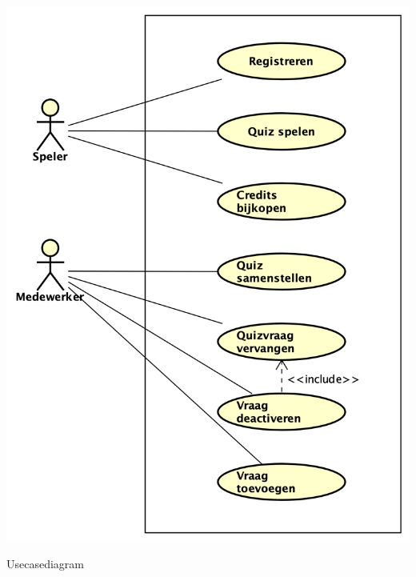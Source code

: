 \begin{mpfigure}
   \centering
   \includegraphics[scale=0.7]{../Afbeeldingen/use case diagram.png}
   \caption{Usecasediagram}\label{fig:usecasediagram}
\end{mpfigure}

